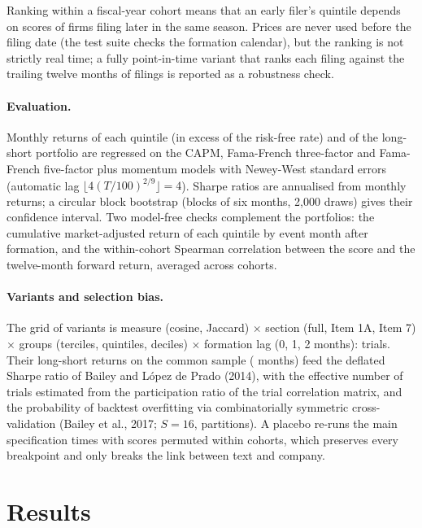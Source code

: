 \documentclass[11pt,a4paper]{article}
\begin{document}
Ranking within a fiscal-year cohort means that an early filer's quintile depends on scores of firms filing later in the same season. Prices are never used before the filing date (the test suite checks the formation calendar), but the ranking is not strictly real time; a fully point-in-time variant that ranks each filing against the trailing twelve months of filings is reported as a robustness check.

\paragraph{Evaluation.} Monthly returns of each quintile (in excess of the risk-free rate) and of the long-short portfolio are regressed on the CAPM, Fama-French three-factor and Fama-French five-factor plus momentum models with Newey-West standard errors (automatic lag $\lfloor 4(T/100)^{2/9}\rfloor = 4$). Sharpe ratios are annualised from monthly returns; a circular block bootstrap (blocks of six months, 2,000 draws) gives their confidence interval. Two model-free checks complement the portfolios: the cumulative market-adjusted return of each quintile by event month after formation, and the within-cohort Spearman correlation between the score and the twelve-month forward return, averaged across cohorts.

\paragraph{Variants and selection bias.} The grid of variants is measure (cosine, Jaccard) $\times$ section (full, Item 1A, Item 7) $\times$ groups (terciles, quintiles, deciles) $\times$ formation lag (0, 1, 2 months): \nTrials{} trials. Their long-short returns on the common sample (\nObsCommon{} months) feed the deflated Sharpe ratio of Bailey and L\'opez de Prado (2014), with the effective number of trials estimated from the participation ratio of the trial correlation matrix, and the probability of backtest overfitting via combinatorially symmetric cross-validation (Bailey et al., 2017; $S = 16$, \cscvCombos{} partitions). A placebo re-runs the main specification \nPlacebo{} times with scores permuted within cohorts, which preserves every breakpoint and only breaks the link between text and company.

\section{Results}\label{sec:results}
\end{document}
